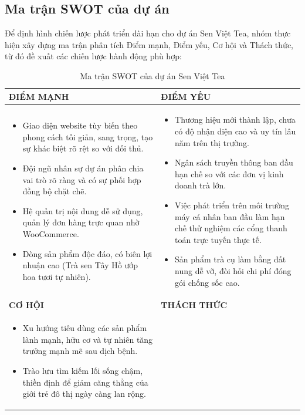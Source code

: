 \subsection{Ma trận SWOT của dự án}

Để định hình chiến lược phát triển dài hạn cho dự án Sen Việt Tea, nhóm thực hiện xây dựng ma trận phân tích Điểm mạnh, Điểm yếu, Cơ hội và Thách thức, từ đó đề xuất các chiến lược hành động phù hợp:

\begin{longtable}{p{7.5cm}p{7.5cm}}
\caption{Ma trận SWOT của dự án Sen Việt Tea}
\label{tab:swot} \\
\toprule
\textbf{ĐIỂM MẠNH} & \textbf{ĐIỂM YẾU} \\ \midrule
\begin{itemize}
    \item Giao diện website tùy biến theo phong cách tối giản, sang trọng, tạo sự khác biệt rõ rệt so với đối thủ.
    \item Đội ngũ nhân sự dự án phân chia vai trò rõ ràng và có sự phối hợp đồng bộ chặt chẽ.
    \item Hệ quản trị nội dung dễ sử dụng, quản lý đơn hàng trực quan nhờ WooCommerce.
    \item Dòng sản phẩm độc đáo, có biên lợi nhuận cao (Trà sen Tây Hồ ướp hoa tươi tự nhiên).
\end{itemize} & 
\begin{itemize}
    \item Thương hiệu mới thành lập, chưa có độ nhận diện cao và uy tín lâu năm trên thị trường.
    \item Ngân sách truyền thông ban đầu hạn chế so với các đơn vị kinh doanh trà lớn.
    \item Việc phát triển trên môi trường máy cá nhân ban đầu làm hạn chế thử nghiệm các cổng thanh toán trực tuyến thực tế.
    \item Sản phẩm trà cụ làm bằng đất nung dễ vỡ, đòi hỏi chi phí đóng gói chống sốc cao.
\end{itemize} \\ \addlinespace \midrule
\textbf{CƠ HỘI} & \textbf{THÁCH THỨC} \\ \midrule
\begin{itemize}
    \item Xu hướng tiêu dùng các sản phẩm lành mạnh, hữu cơ và tự nhiên tăng trưởng mạnh mẽ sau dịch bệnh.
    \item Trào lưu tìm kiếm lối sống chậm, thiền định để giảm căng thẳng của giới trẻ đô thị ngày càng lan rộng.

\end{itemize}
\end{longtable}
